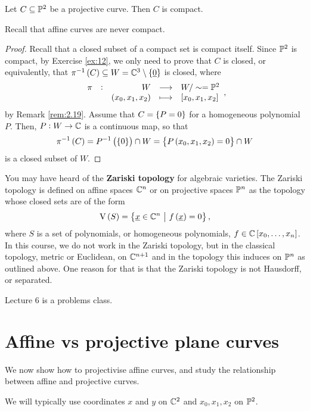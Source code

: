 \begin{lemma}
Let $ C \subseteq \mathbb{P}^2 $ be a projective curve. Then $ C $ is compact.
\end{lemma}

Recall that affine curves are never compact.

\begin{proof}
Recall that a closed subset of a compact set is compact itself. Since $ \mathbb{P}^2 $ is compact, by Exercise \ref{ex:12}, we only need to prove that $ C $ is closed, or equivalently, that $ \pi^{-1}\br{C} \subseteq W = \CC^3 \setminus \cbr{\underline{0}} $ is closed, where
$$ \function[\pi]{W}{W / \sim = \PP^2}{\br{x_0, x_1, x_2}}{\sbr{x_0, x_1, x_2}}, $$
by Remark \ref{rem:2.19}. Assume that $ C = \cbr{P = 0} $ for a homogeneous polynomial $ P $. Then, $ P : W \to \mathbb{C} $ is a continuous map, so that
$$ \pi^{-1}\br{C} = P^{-1}\br{\cbr{0}} \cap W = \cbr{P\br{x_0, x_1, x_2} = 0} \cap W $$
is a closed subset of $ W $.
\end{proof}

\begin{remark}
You may have heard of the \textbf{Zariski topology} for algebraic varieties. The Zariski topology is defined on affine spaces $ \mathbb{C}^n $ or on projective spaces $ \mathbb{P}^n $ as the topology whose closed sets are of the form
$$ \V\br{S} = \cbr{\underline{x} \in \CC^n \st f\br{\underline{x}} = 0}, $$
where $ S $ is a set of polynomials, or homogeneous polynomials, $ f \in \CC\sbr{x_0, \dots, x_n} $. In this course, we do not work in the Zariski topology, but in the classical topology, metric or Euclidean, on $ \mathbb{C}^{n + 1} $ and in the topology this induces on $ \mathbb{P}^n $ as outlined above. One reason for that is that the Zariski topology is not Hausdorff, or separated.
\end{remark}


Lecture 6 is a problems class.

\pagebreak

\section{Affine vs projective plane curves}

We now show how to projectivise affine curves, and study the relationship between affine and projective curves.

\begin{notation}
We will typically use coordinates $ x $ and $ y $ on $ \mathbb{C}^2 $ and $ x_0, x_1, x_2 $ on $ \mathbb{P}^2 $.
\end{notation}

